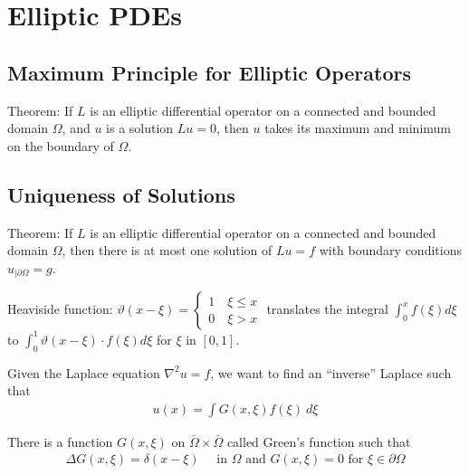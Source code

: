 \section{Elliptic PDEs}
\subsection{Maximum Principle for Elliptic Operators}
Theorem: If $L$ is an elliptic differential operator on a connected and bounded domain $\Omega$,
and $u$ is a solution $Lu = 0$, then $u$ takes its maximum and minimum on the boundary of $\Omega$.

\subsection{Uniqueness of Solutions}
Theorem: If $L$ is an elliptic differential operator on a connected and bounded domain $\Omega$,
then there is at most one solution of $Lu = f$ with boundary conditions $u_{|\partial\Omega} = g$.


\begin{addmargin}[1em]{0em}
    {\color{teal}
        Heaviside function: $\vartheta(x - \xi) = \left\{ \begin{matrix}
            1\quad \xi\leq x \\
            0\quad \xi > x
        \end{matrix} \right.$
        translates the integral $\int_0^xf(\xi)d\xi$ to $\int_0^1\vartheta(x-\xi)\cdot f(\xi)d\xi$ for $\xi$
        in $[0,1]$.
    }
\end{addmargin}

Given the Laplace equation $\nabla^2u=f$, we want to find an ``inverse'' Laplace such that
\begin{align*}
    u(x) = \int G(x,\xi)f(\xi)\ d\xi
\end{align*}

There is a function $G(x,\xi)$ on $\bar{\Omega}\times\bar{\Omega}$ called Green's function such that
\begin{align*}
    \Delta G(x,\xi) = \delta(x-\xi)\quad\text{ in }\Omega\text{ and }G(x,\xi) = 0\text{ for }\xi\in\partial\Omega
\end{align*}

